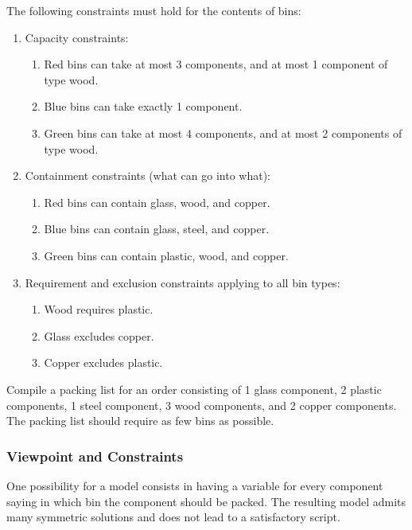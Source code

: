 \documentclass[a4paper]{scrartcl}
\begin{document}
The following constraints must hold for the contents of bins:
\begin{enumerate}
\item
Capacity constraints:
\begin{enumerate}       
\item
Red bins can take at most 3 components, and at most 1 component of type wood.
\item
Blue bins can take exactly 1 component.
\item
Green bins can take at most 4 components, and at most 2 components of type wood.
\end{enumerate}
\item
Containment constraints (what can go into what):
\begin{enumerate}       
\item    
Red bins can contain glass, wood, and copper.
\item        
Blue bins can contain glass, steel, and copper.
\item        
Green bins can contain plastic, wood, and copper.
\end{enumerate}
\item
Requirement and exclusion constraints applying to all bin types:
\begin{enumerate}    
\item         
Wood requires plastic.
\item       
Glass excludes copper.
\item          
Copper excludes plastic.
\end{enumerate}
\end{enumerate}
Compile a packing list for an order consisting of 1 glass component, 
2 plastic components, 1 steel component, 3 wood components, and 2 
copper components. The packing list should require as few bins as possible.

\subsubsection{Viewpoint and Constraints}
One possibility for a model consists in having a variable for every 
component saying in which bin the component should be packed. The 
resulting model admits many symmetric solutions and does not lead 
to a satisfactory script.\\
\end{document}
